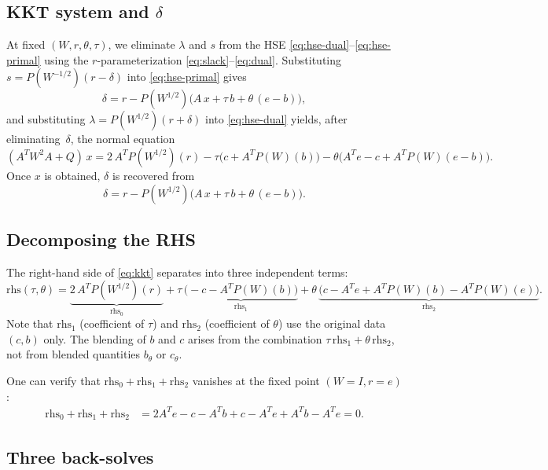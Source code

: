 \documentclass{article}
\newcommand{\PW}{P(W^{1/2})}
\newcommand{\PiW}{P(W^{-1/2})}
\newcommand{\Psq}{P(W)}
\begin{document}
\subsection{KKT system and $\delta$}

At fixed $(W, r, \theta, \tau)$, we eliminate $\lambda$ and $s$
from the HSE \eqref{eq:hse-dual}--\eqref{eq:hse-primal}
using the $r$-parameterization \eqref{eq:slack}--\eqref{eq:dual}.
Substituting $s = \PiW(r-\delta)$ into \eqref{eq:hse-primal} gives
\[
  \delta = r - \PW\bigl(A\,x + \tau\,b + \theta\,(e - b)\bigr),
\]
and substituting $\lambda = \PW(r+\delta)$ into \eqref{eq:hse-dual}
yields, after eliminating~$\delta$, the normal equation
\begin{equation}\label{eq:kkt}
  (A^T W^2 A + Q)\,x = 2\,A^T\PW(r)
    - \tau\bigl(c + A^T\Psq(b)\bigr)
    - \theta\bigl(A^Te - c + A^T\Psq(e - b)\bigr).
\end{equation}
Once $x$ is obtained, $\delta$ is recovered from
\begin{equation}\label{eq:delta-from-x}
  \delta = r - \PW\bigl(A\,x + \tau\,b + \theta\,(e - b)\bigr).
\end{equation}

\subsection{Decomposing the RHS}

The right-hand side of \eqref{eq:kkt} separates into
three independent terms:
\[
  \text{rhs}(\tau,\theta) =
    \underbrace{2\,A^T \PW(r)}_{\text{rhs}_0}
  + \tau\,\underbrace{\bigl(-c - A^T \Psq(b)\bigr)}_{\text{rhs}_1}
  + \theta\,\underbrace{\bigl(c - A^T e + A^T\Psq(b) - A^T\Psq(e)\bigr)}_{\text{rhs}_2}.
\]
Note that $\text{rhs}_1$ (coefficient of $\tau$) and $\text{rhs}_2$
(coefficient of $\theta$) use the original data $(c, b)$ only.
The blending of $b$ and $c$ arises from the combination
$\tau\,\text{rhs}_1 + \theta\,\text{rhs}_2$, not from
blended quantities $b_\theta$ or $c_\theta$.

One can verify that $\text{rhs}_0 + \text{rhs}_1 + \text{rhs}_2$
vanishes at the fixed point $(W=I, r=e)$:
\begin{align*}
  \text{rhs}_0 + \text{rhs}_1 + \text{rhs}_2
  &= 2A^Te - c - A^Tb + c - A^Te + A^Tb - A^Te = 0.
\end{align*}

\subsection{Three back-solves}
\end{document}
